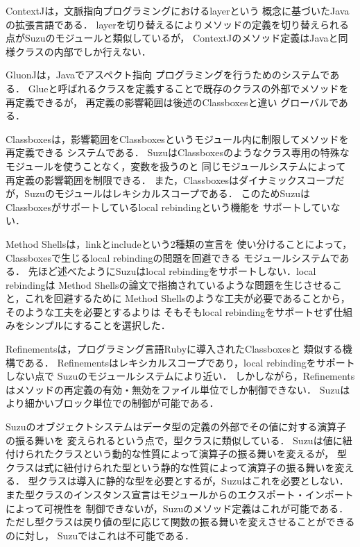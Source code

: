 \documentclass{ipsjprosym}
\begin{document}
ContextJ\cite{AppeltauerMalte:2011}は，文脈指向プログラミングにおけるlayerという
概念に基づいたJavaの拡張言語である．
layerを切り替えるによりメソッドの定義を切り替えられる点がSuzuのモジュールと類似しているが，
ContextJのメソッド定義はJavaと同様クラスの内部でしか行えない．

GluonJ\cite{Chiba:2010:MMC:1869459.1869503}は，Javaでアスペクト指向
プログラミングを行うためのシステムである．
Glueと呼ばれるクラスを定義することで既存のクラスの外部でメソッドを再定義できるが，
再定義の影響範囲は後述のClassboxes\cite{Bergel:2005:CCV:1646591.1646599}と違い
グローバルである．

Classboxesは，影響範囲をClassboxesというモジュール内に制限してメソッドを再定義できる
システムである．
SuzuはClassboxesのようなクラス専用の特殊なモジュールを使うことなく，変数を扱うのと
同じモジュールシステムによって再定義の影響範囲を制限できる．
また，Classboxesはダイナミックスコープだが，Suzuのモジュールはレキシカルスコープである．
このためSuzuはClassboxesがサポートしているlocal rebindingという機能を
サポートしていない．

Method Shells\cite{Takeshita:2014-07-14}は，linkとincludeという2種類の宣言を
使い分けることによって，Classboxesで生じるlocal rebindingの問題を回避できる
モジュールシステムである．
先ほど述べたようにSuzuはlocal rebindingをサポートしない．local rebindingは
Method Shellsの論文で指摘されているような問題を生じさせること，これを回避するために
Method Shellsのような工夫が必要であることから，そのような工夫を必要とするよりは
そもそもlocal rebindingをサポートせず仕組みをシンプルにすることを選択した．

Refinements\cite{Maeda:2013}は，プログラミング言語Rubyに導入されたClassboxesと
類似する機構である．
Refinementsはレキシカルスコープであり，local rebindingをサポートしない点で
Suzuのモジュールシステムにより近い．
しかしながら，Refinementsはメソッドの再定義の有効・無効をファイル単位でしか制御できない．
Suzuはより細かいブロック単位での制御が可能である．

Suzuのオブジェクトシステムはデータ型の定義の外部でその値に対する演算子の振る舞いを
変えられるという点で，型クラス\cite{Wadler:1989:MAP:75277.75283}に類似している．
Suzuは値に紐付けられたクラスという動的な性質によって演算子の振る舞いを変えるが，
型クラスは式に紐付けられた型という静的な性質によって演算子の振る舞いを変える．
型クラスは導入に静的な型を必要とするが，Suzuはこれを必要としない．
また型クラスのインスタンス宣言はモジュールからのエクスポート・インポートによって可視性を
制御できないが，Suzuのメソッド定義はこれが可能である．
ただし型クラスは戻り値の型に応じて関数の振る舞いを変えさせることができるのに対し，
Suzuではこれは不可能である．
\end{document}
